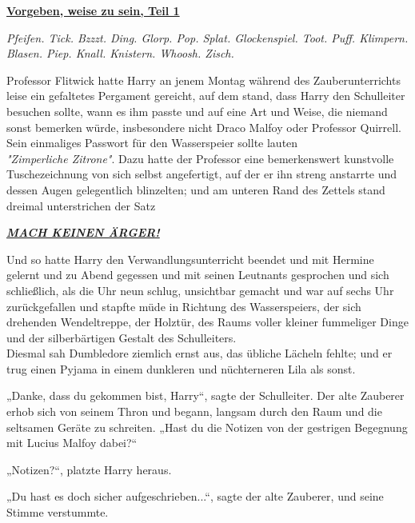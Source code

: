 

\hypertarget{vorgeben-weise-zu-sein-teil-1}{%

\textbf{\uline{Vorgeben, weise zu sein, Teil 1\\ }}

\hfill\break \emph{Pfeifen. Tick. Bzzzt. Ding. Glorp. Pop. Splat. Glockenspiel. Toot. Puff. Klimpern. Blasen. Piep. Knall. Knistern. Whoosh. Zisch.}

Professor Flitwick hatte Harry an jenem Montag während des Zauberunterrichts leise ein gefaltetes Pergament gereicht, auf dem stand, dass Harry den Schulleiter besuchen sollte, wann es ihm passte und auf eine Art und Weise, die niemand sonst bemerken würde, insbesondere nicht Draco Malfoy oder Professor Quirrell. Sein einmaliges Passwort für den Wasserspeier sollte lauten\\ \emph{"Zimperliche Zitrone"}. Dazu hatte der Professor eine bemerkenswert kunstvolle Tuschezeichnung von sich selbst angefertigt, auf der er ihn streng anstarrte und dessen Augen gelegentlich blinzelten; und am unteren Rand des Zettels stand dreimal unterstrichen der Satz

\textbf{\emph{\uline{MACH KEINEN ÄRGER!}}}

Und so hatte Harry den Verwandlungsunterricht beendet und mit Hermine gelernt und zu Abend gegessen und mit seinen Leutnants gesprochen und sich schließlich, als die Uhr neun schlug, unsichtbar gemacht und war auf sechs Uhr zurückgefallen und stapfte müde in Richtung des Wasserspeiers, der sich drehenden Wendeltreppe, der Holztür, des Raums voller kleiner fummeliger Dinge und der silberbärtigen Gestalt des Schulleiters.\\ Diesmal sah Dumbledore ziemlich ernst aus, das übliche Lächeln fehlte; und er trug einen Pyjama in einem dunkleren und nüchterneren Lila als sonst.

„Danke, dass du gekommen bist, Harry“, sagte der Schulleiter. Der alte Zauberer erhob sich von seinem Thron und begann, langsam durch den Raum und die seltsamen Geräte zu schreiten. „Hast du die Notizen von der gestrigen Begegnung mit Lucius Malfoy dabei?“

„Notizen?“, platzte Harry heraus.

„Du hast es doch sicher aufgeschrieben...“, sagte der alte Zauberer, und seine Stimme verstummte.

}
